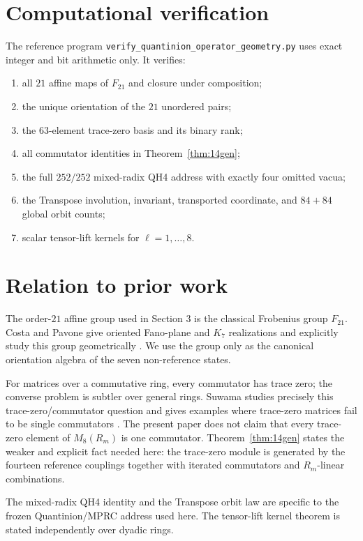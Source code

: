 \documentclass[11pt]{article}
\theoremstyle{definition}
\begin{document}
\section{Computational verification}
The reference program \texttt{verify\_quantinion\_operator\_geometry.py} uses exact integer and bit arithmetic only. It verifies:
\begin{enumerate}[leftmargin=*]
\item all $21$ affine maps of $F_{21}$ and closure under composition;
\item the unique orientation of the $21$ unordered pairs;
\item the $63$-element trace-zero basis and its binary rank;
\item all commutator identities in Theorem~\ref{thm:14gen};
\item the full $252/252$ mixed-radix QH4 address with exactly four omitted vacua;
\item the Transpose involution, invariant, transported coordinate, and $84+84$ global orbit counts;
\item scalar tensor-lift kernels for $\ell=1,\ldots,8$.
\end{enumerate}

\section{Relation to prior work}
The order-$21$ affine group used in Section 3 is the classical Frobenius group $F_{21}$. Costa and Pavone give oriented Fano-plane and $K_7$ realizations and explicitly study this group geometrically \cite{CostaPavone2024}. We use the group only as the canonical orientation algebra of the seven non-reference states.

For matrices over a commutative ring, every commutator has trace zero; the converse problem is subtler over general rings. Suwama studies precisely this trace-zero/commutator question and gives examples where trace-zero matrices fail to be single commutators \cite{Suwama2023}. The present paper does not claim that every trace-zero element of $M_8(R_m)$ is one commutator. Theorem~\ref{thm:14gen} states the weaker and explicit fact needed here: the trace-zero module is generated by the fourteen reference couplings together with iterated commutators and $R_m$-linear combinations.

The mixed-radix QH4 identity and the Transpose orbit law are specific to the frozen Quantinion/MPRC address used here. The tensor-lift kernel theorem is stated independently over dyadic rings.
\end{document}
